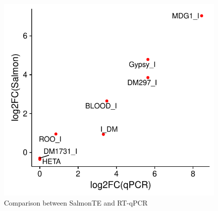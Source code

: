 \documentclass{ws-procs11x85}
\begin{document}


\begin{figure}[h]
\centerline{
\includegraphics[width=15cm]{supp_fig3_corr}
}
\caption{Comparison between SalmonTE and RT-qPCR}
\label{aba:fig4}
\end{figure}
\end{document}
